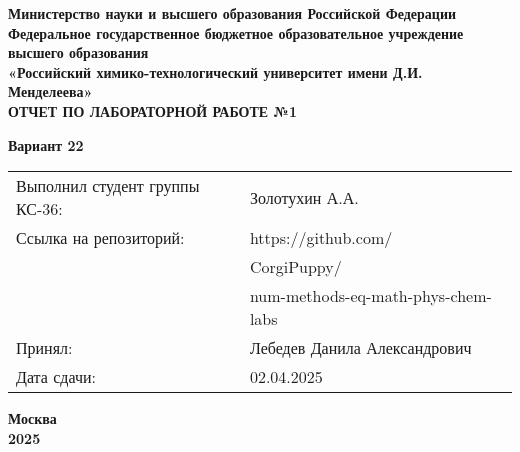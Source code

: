 \documentclass[12pt, a4paper]{report}
\begin{document}
	\begin{titlepage}
		\begin{center}
			\large \textbf{Министерство науки и высшего образования Российской Федерации} \\
			\large \textbf{Федеральное государственное бюджетное образовательное учреждение высшего образования} \\
			\large \textbf{«Российский химико-технологический университет имени Д.И. Менделеева»} \\

			\vspace*{4cm}
			\LARGE \textbf{ОТЧЕТ ПО ЛАБОРАТОРНОЙ РАБОТЕ №1}

			\vspace*{1cm}
			\LARGE \textbf{Вариант 22}

			\vspace*{4cm}
			\begin{flushright}
				\Large
				\begin{tabular}{>{\raggedleft\arraybackslash}p{9cm} p{10cm}}
					Выполнил студент группы КС-36: & Золотухин А.А. \\
					Ссылка на репозиторий: & https://github.com/ \\
					& CorgiPuppy/ \\
					& num-methods-eq-math-phys-chem-labs \\
					Принял: & Лебедев Данила Александрович \\
					Дата сдачи: & 02.04.2025 \\
				\end{tabular}
			\end{flushright}

			\vspace*{4cm}
			\Large \textbf{Москва \\ 2025}
		\end{center}
	\end{titlepage}

	\tableofcontents
	\thispagestyle{empty}
	\newpage

\end{document}
